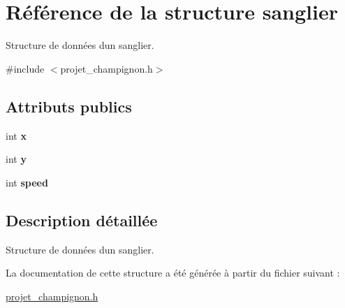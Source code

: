 \hypertarget{structsanglier}{}\section{Référence de la structure sanglier}
\label{structsanglier}


Structure de données d\textquotesingle{}un sanglier.  




{\ttfamily \#include $<$projet\+\_\+champignon.\+h$>$}

\subsection*{Attributs publics}
\begin{DoxyCompactItemize}
\item 
\mbox{\label{structsanglier_a169c02828359c1eb45f80e86700042ae}} 
int {\bfseries x}
\item 
\mbox{\label{structsanglier_a3fefb60e8da88994210858c29a9c7dfb}} 
int {\bfseries y}
\item 
\mbox{\label{structsanglier_a7652c931195a673beebbc62da53b9eab}} 
int {\bfseries speed}
\end{DoxyCompactItemize}


\subsection{Description détaillée}
Structure de données d\textquotesingle{}un sanglier. 

La documentation de cette structure a été générée à partir du fichier suivant \+:\begin{DoxyCompactItemize}
\item 
\hyperlink{projet__champignon_8h}{projet\+\_\+champignon.\+h}\end{DoxyCompactItemize}
